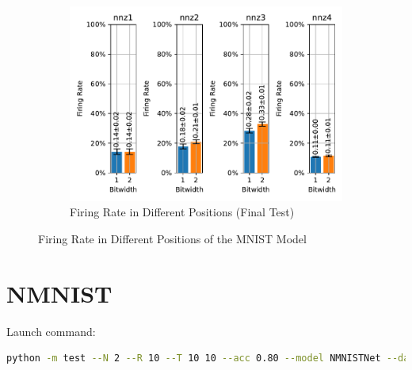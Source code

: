         \begin{figure}[H]
            \centering
            \ContinuedFloat
            \begin{subfigure}[H]{\textwidth}
                \centering
                \includegraphics[width=\textwidth]{../firerate/MNIST/plots/mnist_final_firerate.pdf}
                \caption{Firing Rate in Different Positions (Final Test)}
            \end{subfigure}
            \caption{Firing Rate in Different Positions of the MNIST Model}
        \end{figure}

    \section{NMNIST}
    \label{appendix:firerate_nmnist}
        Launch command: 
        \begin{lstlisting}[language=Bash, basicstyle=\small, breaklines=true]
python -m test --N 2 --R 10 --T 10 10 --acc 0.80 --model NMNISTNet --data-path /scratch/zyi/codeSpace/data --dataset NMNIST --batch-size 128 --opt adam --lr 2e-3 --lr-scheduler none --epochs 50 --lr-warmup-epochs 0 --output-dir /scratch/zyi/codeSpace/MultibitSpikes/firerate --mixup-alpha 0.0 --cutmix-alpha 0.0 --label-smoothing 0.0 --disable-amp
        \end{lstlisting}

